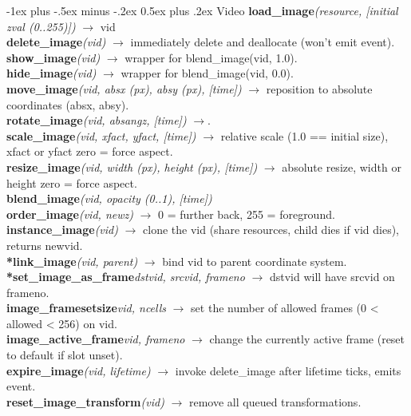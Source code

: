 \documentclass[10pt,landscape]{article}
\makeatletter
\renewcommand{\section}{\@startsection{section}{1}{0mm}%
                                {-1ex plus -.5ex minus -.2ex}%
                                {0.5ex plus .2ex}%
                                {\normalfont\large\bfseries}}
\makeatother
\begin{document}
\begin{multicols}{3}
\section{Video}
	\textbf{load\_image}\emph{(resource, [initial zval (0..255)])} $\rightarrow$ vid\\
	\textbf{delete\_image}\emph{(vid)} $\rightarrow$ immediately delete and deallocate (won't emit event).\\
	\textbf{show\_image}\emph{(vid)} $\rightarrow$ wrapper for blend\_image(vid, 1.0).\\
	\textbf{hide\_image}\emph{(vid)} $\rightarrow$ wrapper for blend\_image(vid, 0.0).\\
	\textbf{move\_image}\emph{(vid, absx (px), absy (px), [time])} $\rightarrow$ reposition to absolute coordinates (absx, absy).\\
	\textbf{rotate\_image}\emph{(vid, absangz, [time])} $\rightarrow$.\\
	\textbf{scale\_image}\emph{(vid, xfact, yfact, [time])} $\rightarrow$ relative scale (1.0 == initial size), xfact or yfact zero = force aspect.\\
	\textbf{resize\_image}\emph{(vid, width (px), height (px), [time])} $\rightarrow$ absolute resize, width or height zero = force aspect.\\
	\textbf{blend\_image}\emph{(vid, opacity (0..1), [time])}\\
	\textbf{order\_image}\emph{(vid, newz)} $\rightarrow$ 0 = further back, 255 = foreground.\\
	\textbf{instance\_image}\emph{(vid)} $\rightarrow$ clone the vid (share resources, child dies if vid dies), returns newvid.\\
	\textbf{*link\_image}\emph{(vid, parent)} $\rightarrow$ bind vid to parent coordinate system.\\
	\textbf{*set\_image\_as\_frame}\emph{dstvid, srcvid, frameno} $\rightarrow$ dstvid will have srcvid on frameno.\\
	\textbf{image\_framesetsize}\emph{vid, ncells} $\rightarrow$ set the number of allowed frames (0 < allowed < 256) on vid.\\
	\textbf{image\_active\_frame}\emph{vid, frameno} $\rightarrow$ change the currently active frame (reset to default if slot unset).\\
	\textbf{expire\_image}\emph{(vid, lifetime)} $\rightarrow$ invoke delete\_image after lifetime ticks, emits event.\\
	\textbf{reset\_image\_transform}\emph{(vid)} $\rightarrow$ remove all queued transformations.\\

\end{multicols}
\end{document}
